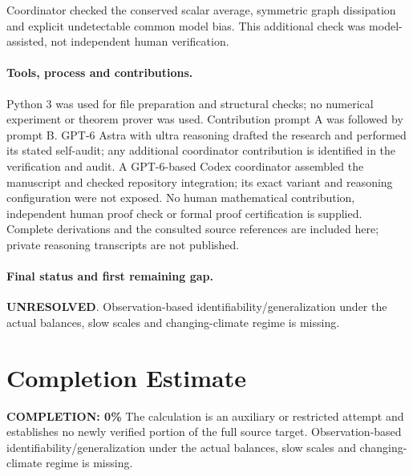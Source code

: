 \documentclass[11pt]{article}
\begin{document}
Coordinator checked the conserved scalar average, symmetric graph dissipation and explicit undetectable common model bias. This additional check was model-assisted, not independent human verification.

\paragraph{Tools, process and contributions.}
Python 3 was used for file preparation and structural checks; no numerical experiment or theorem prover was used. Contribution prompt A was followed by prompt B. GPT-6 Astra with ultra reasoning drafted the research and performed its stated self-audit; any additional coordinator contribution is identified in the verification and audit. A GPT-6-based Codex coordinator assembled the manuscript and checked repository integration; its exact variant and reasoning configuration were not exposed. No human mathematical contribution, independent human proof check or formal proof certification is supplied. Complete derivations and the consulted source references are included here; private reasoning transcripts are not published.

\paragraph{Final status and first remaining gap.}
\textbf{UNRESOLVED}. Observation-based identifiability/generalization under the actual balances, slow scales and changing-climate regime is missing.

\section{Completion Estimate}
\noindent\textbf{COMPLETION: 0\%}
The calculation is an auxiliary or restricted attempt and establishes no newly verified portion of the full source target. Observation-based identifiability/generalization under the actual balances, slow scales and changing-climate regime is missing.
\end{document}
